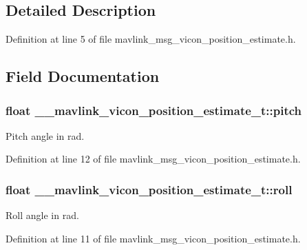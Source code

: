 \subsection{Detailed Description}


Definition at line 5 of file mavlink\-\_\-msg\-\_\-vicon\-\_\-position\-\_\-estimate.\-h.



\subsection{Field Documentation}
\hypertarget{struct____mavlink__vicon__position__estimate__t_ac65d824a08fcaad66059ebecaf70ab87}{
\subsubsection[{pitch}]{\setlength{\rightskip}{0pt plus 5cm}float \-\_\-\-\_\-mavlink\-\_\-vicon\-\_\-position\-\_\-estimate\-\_\-t\-::pitch}}\label{struct____mavlink__vicon__position__estimate__t_ac65d824a08fcaad66059ebecaf70ab87}


Pitch angle in rad. 



Definition at line 12 of file mavlink\-\_\-msg\-\_\-vicon\-\_\-position\-\_\-estimate.\-h.

\hypertarget{struct____mavlink__vicon__position__estimate__t_a6c0f853781f0767b9915cb6e194815ad}{
\subsubsection[{roll}]{\setlength{\rightskip}{0pt plus 5cm}float \-\_\-\-\_\-mavlink\-\_\-vicon\-\_\-position\-\_\-estimate\-\_\-t\-::roll}}\label{struct____mavlink__vicon__position__estimate__t_a6c0f853781f0767b9915cb6e194815ad}


Roll angle in rad. 



Definition at line 11 of file mavlink\-\_\-msg\-\_\-vicon\-\_\-position\-\_\-estimate.\-h.

